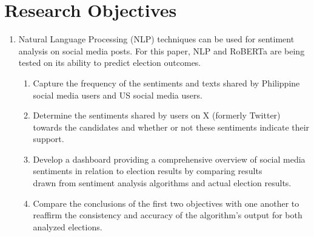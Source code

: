 \section{Research Objectives}
\begin{enumerate}
    \item Natural Language Processing (NLP) techniques can be used for sentiment analysis on social media posts. For this paper, NLP and RoBERTa are being tested on its ability to predict election outcomes.
    \begin{enumerate}
        \item Capture the frequency of the sentiments and texts shared by Philippine social media users and US social media users.
        \item Determine the sentiments shared by users on X (formerly Twitter) towards the candidates and whether or not these sentiments indicate their support.
        \item Develop a dashboard providing a comprehensive overview of social media sentiments in relation to election results by comparing results\\drawn from sentiment analysis algorithms and actual election results.
        \item Compare the conclusions of the first two objectives with one another to reaffirm the consistency and accuracy of the algorithm’s output for both analyzed elections.
    \end{enumerate}
\end{enumerate}